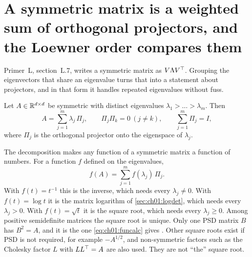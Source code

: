 
\section{A symmetric matrix is a weighted sum of orthogonal projectors, and the Loewner order compares them}\label{sec:ch01:spectral}

Primer~L, section~L.7, writes a symmetric matrix as $V\Lambda V^{\top}$. Grouping
the eigenvectors that share an eigenvalue turns that into a statement about
projectors, and in that form it handles repeated eigenvalues without fuss.

\begin{theorem}\label{thm:ch01:spectral}
Let $A\in\mathbb{R}^{d\times d}$ be symmetric with distinct eigenvalues
$\lambda_1>\dots>\lambda_m$. Then
\begin{equation}\label{eq:ch01:spectral}
A=\sum_{j=1}^m \lambda_j\,\Pi_j,\qquad \Pi_j\Pi_k=0\ (j\neq k),\qquad \sum_{j=1}^m\Pi_j=I,
\end{equation}
where $\Pi_j$ is the orthogonal projector onto the eigenspace of $\lambda_j$.
\end{theorem}

The decomposition makes any function of a symmetric matrix a function of
numbers. For a function $f$ defined on the eigenvalues,
\begin{equation}\label{eq:ch01:funcalc}
f(A)=\sum_{j=1}^m f(\lambda_j)\,\Pi_j .
\end{equation}
With $f(t)=t^{-1}$ this is the inverse, which needs every $\lambda_j\neq0$.
With $f(t)=\log t$ it is the matrix logarithm of \cref{sec:ch01:logdet}, which
needs every $\lambda_j>0$. With $f(t)=\sqrt t$ it is the square root, which
needs every $\lambda_j\ge0$.
Among positive semidefinite matrices the square root is unique. Only one PSD
matrix $B$ has $B^2=A$, and it is the one \cref{eq:ch01:funcalc} gives
\cite{hornjohnson2012}. Other square roots exist if PSD is not required, for
example $-A^{1/2}$, and non-symmetric factors such as the Cholesky factor $L$
with $LL^{\top}=A$ are also used. They are not ``the'' square root.

